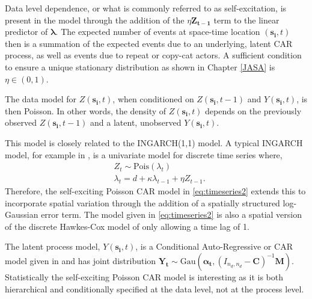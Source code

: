 \documentclass[11pt]{isuthesis}
\begin{document}
	Data level dependence, or what is commonly referred to as self-excitation, is present in the model through the addition of the $\eta \boldsymbol{Z_{t-1}}$ term to the linear predictor of $\boldsymbol{\lambda}$.  The expected number of events at space-time location $(\boldsymbol{s_i},t)$ then is a summation of the expected events due to an underlying, latent CAR process, as well as events due to repeat or copy-cat actors.  A sufficient condition to ensure a unique stationary distribution as shown in Chapter \ref{JASA} is $\eta \in (0,1)$.  
	
	The data model for $Z(\boldsymbol{s_i},t)$, when conditioned on $Z(\boldsymbol{s_i},t-1)$ and $Y(\boldsymbol{s_i},t)$, is then Poisson.  In other words, the density of $Z(\boldsymbol{s_i},t)$ depends on the previously observed $Z(\boldsymbol{s_i},t-1)$ and a latent, unobserved $Y(\boldsymbol{s_i},t)$.
	
	This model is closely related to the INGARCH(1,1) model.  A typical INGARCH model, for example in \cite{davis2016handbook}, is a univariate model for discrete time series where,
	\begin{align}
	& Z_t \sim \mbox{Pois}(\lambda_t) \label{eq:INGARH} \\
	&\lambda_t= d+\kappa \lambda_{t-1}+\eta Z_{t-1}.
	\end{align}
	Therefore, the self-exciting Poisson CAR model in \eqref{eq:timeseries2} extends this to incorporate spatial variation through the addition of a spatially structured log-Gaussian error term.  The model given in \eqref{eq:timeseries2} is also a spatial version of the discrete Hawkes-Cox model of \cite{mohler2013modeling} only allowing a time lag of 1.
	
	The latent process model, $Y(\boldsymbol{s_i},t)$, is a Conditional Auto-Regressive or CAR model given in \cite{cressie2015statistics} and has joint distribution $\boldsymbol{Y_t}\sim \mbox{Gau}(\boldsymbol{\alpha_t},(I_{{n_d},{n_d}}-\boldsymbol{C})^{-1}\boldsymbol{M})$. Statistically the self-exciting Poisson CAR model is interesting as it is both hierarchical and conditionally specified at the data level, not at the process level.  
	
\end{document}
